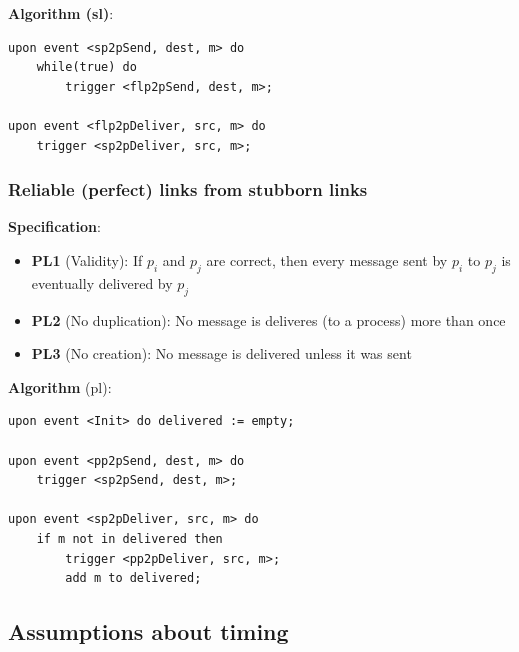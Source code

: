 \documentclass{scrartcl}
\begin{document}
\textbf{Algorithm (sl)}:
\begin{lstlisting}
upon event <sp2pSend, dest, m> do
    while(true) do
        trigger <flp2pSend, dest, m>;

upon event <flp2pDeliver, src, m> do
    trigger <sp2pDeliver, src, m>;
\end{lstlisting}

\subsubsection{Reliable (perfect) links from stubborn links}
\textbf{Specification}:
\begin{itemize}
    \item
        \textbf{PL1} (Validity): If \(p_i\) and \(p_j\) are correct, then every message sent by \(p_i\) to \(p_j\) is eventually delivered by \(p_j\)  
    \item
        \textbf{PL2} (No duplication): No message is deliveres (to a process) more than once
    \item
        \textbf{PL3} (No creation): No message is delivered unless it was sent
\end{itemize}

\textbf{Algorithm} (pl):
\begin{lstlisting}
upon event <Init> do delivered := empty;

upon event <pp2pSend, dest, m> do
    trigger <sp2pSend, dest, m>;

upon event <sp2pDeliver, src, m> do
    if m not in delivered then
        trigger <pp2pDeliver, src, m>;
        add m to delivered;
\end{lstlisting}

\subsection{Assumptions about timing}
\end{document}
